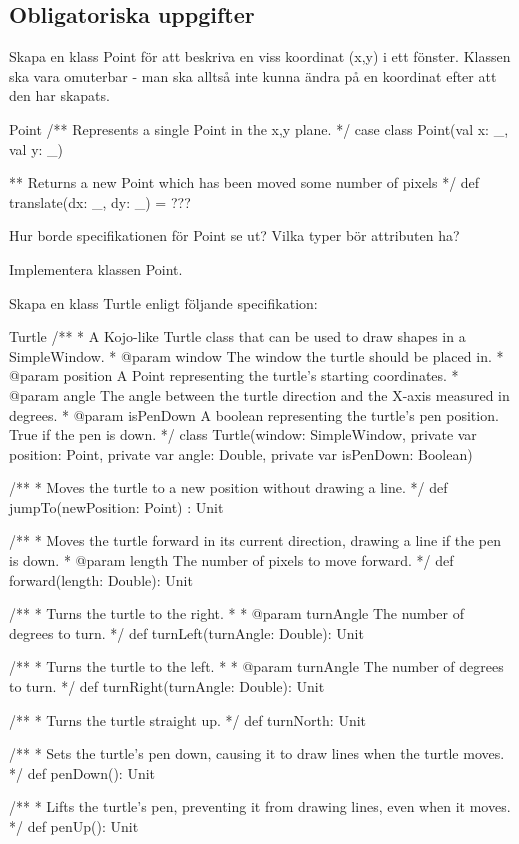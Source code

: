 \subsection{Obligatoriska uppgifter}

\Task Skapa en klass Point för att beskriva en viss koordinat (x,y) i ett fönster. Klassen ska vara omuterbar - man ska alltså inte kunna ändra på en koordinat efter att den har skapats.

\begin{ScalaSpec}{Point}
/** Represents a single Point in the x,y plane. */
case class Point(val x: _, val y: _) {

** Returns a new Point which has been moved some number of pixels */
def translate(dx: _, dy: _) = ???
}
\end{ScalaSpec}

\Subtask Hur borde specifikationen för Point se ut? Vilka typer bör attributen ha?

\Subtask Implementera klassen Point.




\Task Skapa en klass Turtle enligt följande specifikation:

\begin{ScalaSpec}{Turtle}
/**
  * A Kojo-like Turtle class that can be used to draw shapes
    in a SimpleWindow.
  * @param window     The window the turtle should be placed in.
  * @param position   A Point representing the turtle's starting
                      coordinates.
  * @param angle      The angle between the turtle direction and
                      the X-axis measured in degrees.
  * @param isPenDown  A boolean representing the turtle's pen
                      position. True if the pen is down.
  */
class Turtle(window: SimpleWindow, private var position: Point,
      private var angle: Double, private var isPenDown: Boolean) {
  /**
    * Moves the turtle to a new position without drawing a line.
    */
  def jumpTo(newPosition: Point) : Unit

  /**
    * Moves the turtle forward in its current direction, drawing
      a line if the pen is down.
    * @param length The number of pixels to move forward.
    */
  def forward(length: Double): Unit

  /**
    * Turns the turtle to the right.
    *
    * @param turnAngle The number of degrees to turn.
    */
  def turnLeft(turnAngle: Double): Unit

  /**
    * Turns the turtle to the left.
    *
    * @param turnAngle The number of degrees to turn.
    */
  def turnRight(turnAngle: Double): Unit

  /**
    * Turns the turtle straight up.
    */
  def turnNorth: Unit

  /**
    * Sets the turtle's pen down, causing it to draw lines when
      the turtle moves.
    */
  def penDown(): Unit

  /**
    * Lifts the turtle's pen, preventing it from drawing lines,
      even when it moves.
    */
  def penUp(): Unit
}

\end{ScalaSpec}

